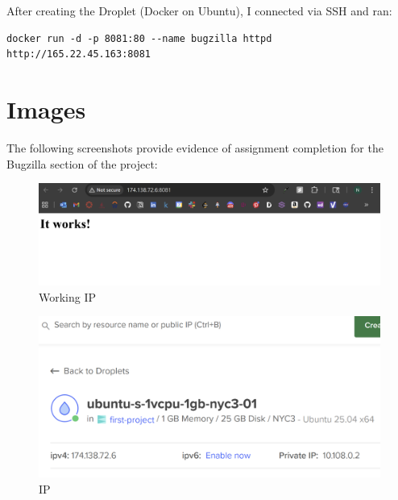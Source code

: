 After creating the Droplet (Docker on Ubuntu), I connected via SSH and ran:
\begin{verbatim}
docker run -d -p 8081:80 --name bugzilla httpd
http://165.22.45.163:8081
\end{verbatim}

\section{Images}
The following screenshots provide evidence of assignment completion for the Bugzilla section of the project:


\begin{figure}[ht]
    \centering
    \includegraphics[width=0.6\linewidth]{Book_SSW590 (1)/eps/Screenshots/Overleaf_1.png}
    \caption{Working IP}
    \label{fig: Working IP}
\end{figure}


\begin{figure}[ht]
    \centering
    \includegraphics[width=0.6\linewidth]{Book_SSW590 (1)/eps/Screenshots/Overleaf_2.png}
    \caption{IP}
    \label{IP}
\end{figure}
